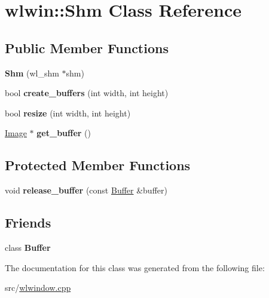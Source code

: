 \hypertarget{classwlwin_1_1Shm}{}\section{wlwin\+::Shm Class Reference}
\label{classwlwin_1_1Shm}
\subsection*{Public Member Functions}
\begin{DoxyCompactItemize}
\item 
\mbox{\label{classwlwin_1_1Shm_a558a03ed3379ff74f9f5dac64ce48b1b}} 
{\bfseries Shm} (wl\+\_\+shm $\ast$shm)
\item 
\mbox{\label{classwlwin_1_1Shm_aeeb1649ce3a3bff03aa607598cec9ca9}} 
bool {\bfseries create\+\_\+buffers} (int width, int height)
\item 
\mbox{\label{classwlwin_1_1Shm_a120e545444ffb0a39efed52661e457ae}} 
bool {\bfseries resize} (int width, int height)
\item 
\mbox{\label{classwlwin_1_1Shm_a46a12d0b3193f2749928300d274c4010}} 
\mbox{\hyperlink{structwlwin_1_1Image}{Image}} $\ast$ {\bfseries get\+\_\+buffer} ()
\end{DoxyCompactItemize}
\subsection*{Protected Member Functions}
\begin{DoxyCompactItemize}
\item 
\mbox{\label{classwlwin_1_1Shm_a3dc3aaa676db9152283162c5fefe693b}} 
void {\bfseries release\+\_\+buffer} (const \mbox{\hyperlink{classwlwin_1_1Buffer}{Buffer}} \&buffer)
\end{DoxyCompactItemize}
\subsection*{Friends}
\begin{DoxyCompactItemize}
\item 
\mbox{\label{classwlwin_1_1Shm_a5ba04a2bf0ca34a0f845cd759950664d}} 
class {\bfseries Buffer}
\end{DoxyCompactItemize}


The documentation for this class was generated from the following file\+:\begin{DoxyCompactItemize}
\item 
src/\mbox{\hyperlink{wlwindow_8cpp}{wlwindow.\+cpp}}\end{DoxyCompactItemize}
